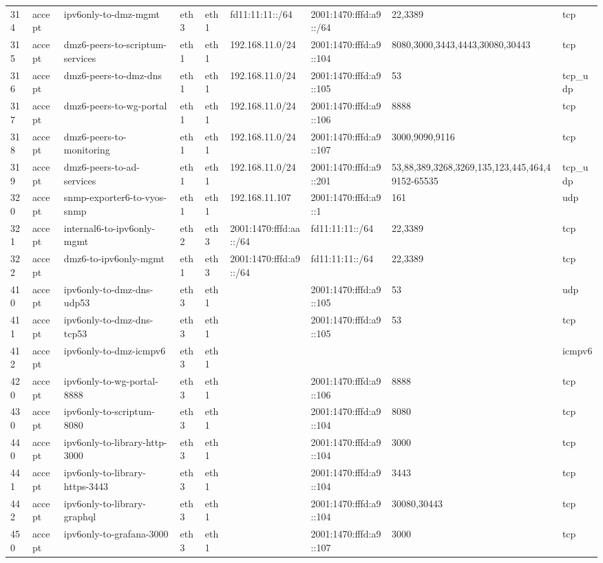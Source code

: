 \begin{longtable}{|l|l|l|l|l|l|l|p{2.2cm}|l|}
314 & accept & ipv6only-to-dmz-mgmt & eth3 & eth1 & fd11:11:11::/64 & 2001:1470:fffd:a9::/64 & 22,3389 & tcp \\
315 & accept & dmz6-peers-to-scriptum-services & eth1 & eth1 & 192.168.11.0/24 & 2001:1470:fffd:a9::104 & 8080,3000,3443,4443,30080,30443 & tcp \\
316 & accept & dmz6-peers-to-dmz-dns & eth1 & eth1 & 192.168.11.0/24 & 2001:1470:fffd:a9::105 & 53 & tcp_udp \\
317 & accept & dmz6-peers-to-wg-portal & eth1 & eth1 & 192.168.11.0/24 & 2001:1470:fffd:a9::106 & 8888 & tcp \\
318 & accept & dmz6-peers-to-monitoring & eth1 & eth1 & 192.168.11.0/24 & 2001:1470:fffd:a9::107 & 3000,9090,9116 & tcp \\
319 & accept & dmz6-peers-to-ad-services & eth1 & eth1 & 192.168.11.0/24 & 2001:1470:fffd:a9::201 & 53,88,389,3268,3269,135,123,445,464,49152-65535 & tcp_udp \\
320 & accept & snmp-exporter6-to-vyos-snmp & eth1 & eth1 & 192.168.11.107 & 2001:1470:fffd:a9::1 & 161 & udp \\
321 & accept & internal6-to-ipv6only-mgmt & eth2 & eth3 & 2001:1470:fffd:aa::/64 & fd11:11:11::/64 & 22,3389 & tcp \\
322 & accept & dmz6-to-ipv6only-mgmt & eth1 & eth3 & 2001:1470:fffd:a9::/64 & fd11:11:11::/64 & 22,3389 & tcp \\
410 & accept & ipv6only-to-dmz-dns-udp53 & eth3 & eth1 &  & 2001:1470:fffd:a9::105 & 53 & udp \\
411 & accept & ipv6only-to-dmz-dns-tcp53 & eth3 & eth1 &  & 2001:1470:fffd:a9::105 & 53 & tcp \\
412 & accept & ipv6only-to-dmz-icmpv6 & eth3 & eth1 &  &  &  & icmpv6 \\
420 & accept & ipv6only-to-wg-portal-8888 & eth3 & eth1 &  & 2001:1470:fffd:a9::106 & 8888 & tcp \\
430 & accept & ipv6only-to-scriptum-8080 & eth3 & eth1 &  & 2001:1470:fffd:a9::104 & 8080 & tcp \\
440 & accept & ipv6only-to-library-http-3000 & eth3 & eth1 &  & 2001:1470:fffd:a9::104 & 3000 & tcp \\
441 & accept & ipv6only-to-library-https-3443 & eth3 & eth1 &  & 2001:1470:fffd:a9::104 & 3443 & tcp \\
442 & accept & ipv6only-to-library-graphql & eth3 & eth1 &  & 2001:1470:fffd:a9::104 & 30080,30443 & tcp \\
450 & accept & ipv6only-to-grafana-3000 & eth3 & eth1 &  & 2001:1470:fffd:a9::107 & 3000 & tcp \\

\end{longtable}
